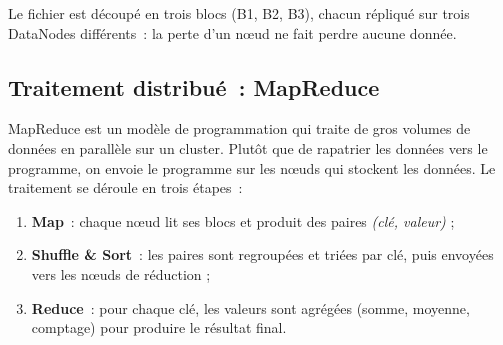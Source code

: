 \noindent Le fichier est découpé en trois blocs (B1, B2, B3), chacun répliqué sur trois DataNodes différents~: la perte d'un nœud ne fait perdre aucune donnée.

\subsection{Traitement distribué~: MapReduce}

\noindent MapReduce est un modèle de programmation qui traite de gros volumes de données en parallèle sur un cluster. Plutôt que de rapatrier les données vers le programme, on envoie le programme sur les nœuds qui stockent les données. Le traitement se déroule en trois étapes~:
\begin{enumerate}
	\item \textbf{Map}~: chaque nœud lit ses blocs et produit des paires \textit{(clé, valeur)} ;
	\item \textbf{Shuffle \& Sort}~: les paires sont regroupées et triées par clé, puis envoyées vers les nœuds de réduction ;
	\item \textbf{Reduce}~: pour chaque clé, les valeurs sont agrégées (somme, moyenne, comptage) pour produire le résultat final.
\end{enumerate}

